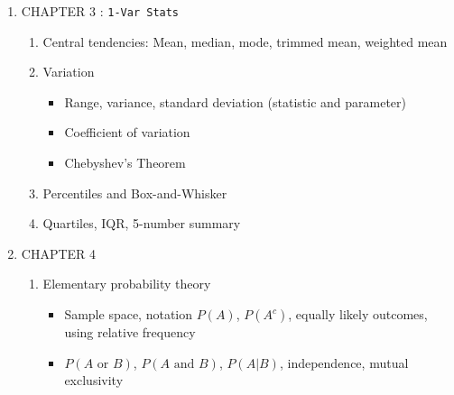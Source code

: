 \documentclass{article}
\begin{document}
\begin{enumerate}
\begin{enumerate}
        \end{enumerate}
        
    \item CHAPTER 3 : \texttt{1-Var Stats}
    
        \begin{enumerate}
        
            \item Central tendencies: Mean, median, mode, trimmed mean, weighted mean
            
            \item Variation
            
                \begin{itemize}
                    
                    \item Range, variance, standard deviation (statistic and parameter)
                    
                    \item Coefficient of variation
                    
                    \item Chebyshev’s Theorem
                
                \end{itemize}
                
            \item Percentiles and Box-and-Whisker
            
            \item Quartiles, IQR, 5-number summary
            
        \end{enumerate}
        
    \item CHAPTER 4
    
        \begin{enumerate}
        
            \item Elementary probability theory
            
                \begin{itemize}
                
                    \item Sample space, notation $P(A)$, $P(A^c)$, equally likely outcomes, using relative frequency
                    
                    \item $P(A \mbox{ or } B)$, $P(A \mbox{ and } B)$, $P(A|B)$, independence, mutual exclusivity
                    

\end{itemize}
\end{enumerate}
\end{enumerate}
\end{document}
